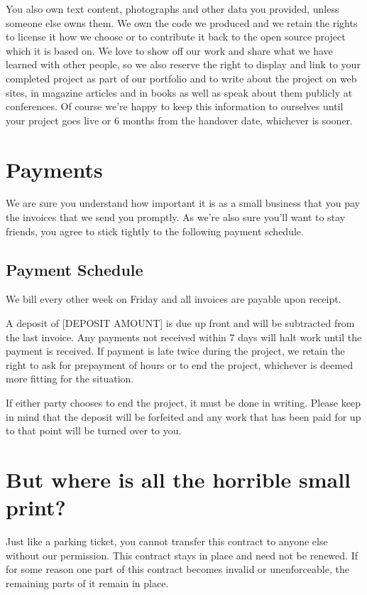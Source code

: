 \documentclass[10pt,a4paper,parskip]{scrartcl}
\begin{document}
You also own text content, photographs and other data you provided, unless
someone else owns them. We own the code we produced and we retain the rights to
license it how we choose or to contribute it back to the open source project
which it is based on.
We love to show off our work and share what we have learned with other people,
so we also reserve the right to display and link to your completed project as
part of our portfolio and to write about the project on web sites, in magazine
articles and in books as well as speak about them publicly at conferences. Of
course we’re happy to keep this information to ourselves until your project
goes live or 6 months from the handover date, whichever is sooner.

\section{Payments}

We are sure you understand how important it is as a small business that you pay
the invoices that we send you promptly.  As we're also sure you'll want to stay
friends, you agree to stick tightly to the following payment schedule.

\subsection{Payment Schedule}

We bill every other week on Friday and all invoices are payable upon receipt.

A deposit of [DEPOSIT AMOUNT] is due up front and will be subtracted from the
last invoice.
Any payments not received within 7 days will halt work until the payment is
received. If payment is late twice during the project, we retain the right to
ask for prepayment of hours or to end the project, whichever is deemed more
fitting for the situation.

If either party chooses to end the project, it must be done in writing. Please
keep in mind that the deposit will be forfeited and any work that has been paid
for up to that point will be turned over to you.

\section{But where is all the horrible small print?}

Just like a parking ticket, you cannot transfer this contract to anyone else
without our permission. This contract stays in place and need not be renewed.
If for some reason one part of this contract becomes invalid or unenforceable,
the remaining parts of it remain in place.
\end{document}
